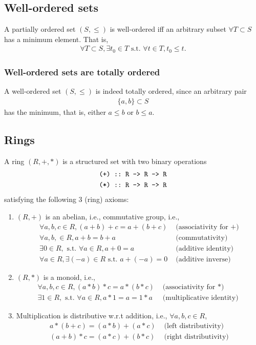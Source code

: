 \documentclass[11pt]{book}
\begin{document}
\subsection{Well-ordered sets}
A partially ordered set $(S, \leq)$ is well-ordered iff an arbitrary subset $\forall T \subset S$ has a minimum element.
That is,
\begin{eqnarray}
\forall T \subset S, \exists t_0 \in T \text{ s.t. } \forall t \in T, t_0 \leq t.
\end{eqnarray}

\subsubsection{Well-ordered sets are totally ordered}
A well-ordered set $(S, \leq)$ is indeed totally ordered, since an arbitrary pair
\begin{eqnarray}
\{a, b\} \subset S
\end{eqnarray}
has the minimum, that is, either $a \leq b$ or $b \leq a$.

\subsection{Rings}
A ring $(R,+,*)$ is a structured set with two binary operations
\begin{eqnarray}
\verb|(+) :: R -> R -> R|\\
\verb|(*) :: R -> R -> R|
\end{eqnarray}
satisfying the following 3 (ring) axioms:
\begin{enumerate}
\item $(R,+)$ is an abelian, i.e., commutative group,
i.e.,
\begin{eqnarray}
\forall a,b,c \in R, (a+b) + c = a + (b + c) & \text{ (associativity for $+$)} \\
\forall a, b, \in R, a+b = b+a & \text{ (commutativity)} \\
\exists 0 \in R, \text{ s.t. } \forall a \in R, a + 0 = a & \text{ (additive identity) } \\
\forall a \in R, \exists (-a) \in R \text{ s.t. } a + (-a) = 0 & \text{ (additive inverse)}
\end{eqnarray}

\item $(R,*)$ is a monoid, i.e.,
\begin{eqnarray}
\forall a,b,c \in R, (a*b) * c = a * (b * c) & \text{ (associativity for $*$)} \\
\exists 1 \in R, \text{ s.t. } \forall a \in R, a * 1 = a = 1*a & \text{ (multiplicative identity) } 
\end{eqnarray}

\item Multiplication is distributive w.r.t addition, i.e., $\forall a,b,c \in R$, 
\begin{eqnarray}
a*(b+c) = (a*b) + (a*c) & \text{ (left distributivity)} \\
(a+b)*c = (a*c) + (b*c) & \text{ (right distributivity)} 
\end{eqnarray}

\end{enumerate}
\end{document}
